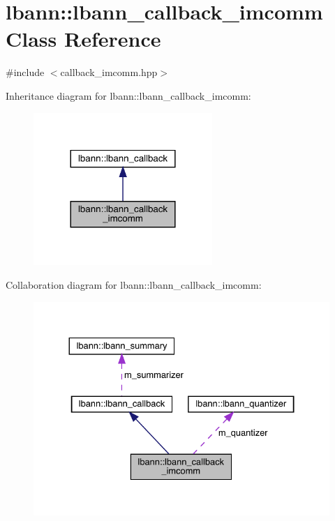 \hypertarget{classlbann_1_1lbann__callback__imcomm}{}\section{lbann\+:\+:lbann\+\_\+callback\+\_\+imcomm Class Reference}
\label{classlbann_1_1lbann__callback__imcomm}


{\ttfamily \#include $<$callback\+\_\+imcomm.\+hpp$>$}



Inheritance diagram for lbann\+:\+:lbann\+\_\+callback\+\_\+imcomm\+:\nopagebreak
\begin{figure}[H]
\begin{center}
\leavevmode
\includegraphics[width=192pt]{classlbann_1_1lbann__callback__imcomm__inherit__graph}
\end{center}
\end{figure}


Collaboration diagram for lbann\+:\+:lbann\+\_\+callback\+\_\+imcomm\+:\nopagebreak
\begin{figure}[H]
\begin{center}
\leavevmode
\includegraphics[width=330pt]{classlbann_1_1lbann__callback__imcomm__coll__graph}
\end{center}
\end{figure}
